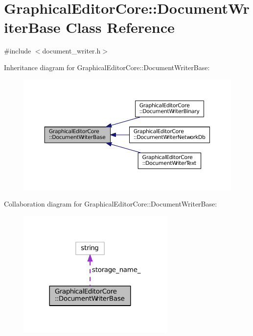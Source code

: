 \hypertarget{classGraphicalEditorCore_1_1DocumentWriterBase}{}\section{Graphical\+Editor\+Core\+:\+:Document\+Writer\+Base Class Reference}
\label{classGraphicalEditorCore_1_1DocumentWriterBase}


{\ttfamily \#include $<$document\+\_\+writer.\+h$>$}



Inheritance diagram for Graphical\+Editor\+Core\+:\+:Document\+Writer\+Base\+:
\nopagebreak
\begin{figure}[H]
\begin{center}
\leavevmode
\includegraphics[width=350pt]{classGraphicalEditorCore_1_1DocumentWriterBase__inherit__graph}
\end{center}
\end{figure}


Collaboration diagram for Graphical\+Editor\+Core\+:\+:Document\+Writer\+Base\+:
\nopagebreak
\begin{figure}[H]
\begin{center}
\leavevmode
\includegraphics[width=221pt]{classGraphicalEditorCore_1_1DocumentWriterBase__coll__graph}
\end{center}
\end{figure}
